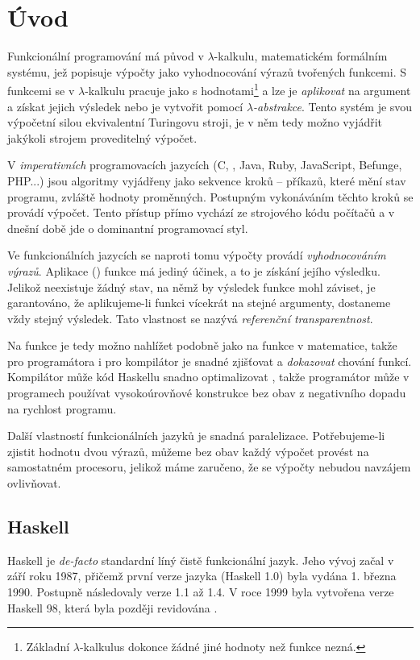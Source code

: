 \chapter{Úvod}

Funkcionální programování má původ v $\lambda$-kalkulu, matematickém formálním
systému, jež popisuje výpočty jako vyhodnocování výrazů tvořených funkcemi.  S
funkcemi se v $\lambda$-kalkulu pracuje jako s hodnotami\footnote{Základní
$\lambda$-kalkulus dokonce žádné jiné hodnoty než funkce nezná.} a lze je
\emph{aplikovat} na argument a získat jejich výsledek nebo je vytvořit pomocí
\emph{$\lambda$-abstrakce}. Tento systém je svou výpočetní silou ekvivalentní
Turingovu stroji, je v něm tedy možno vyjádřit jakýkoli strojem proveditelný
výpočet.

V \emph{imperativních} programovacích jazycích (C, \Cplusplus{}, Java, Ruby,
JavaScript, Befunge, PHP...) jsou algoritmy vyjádřeny jako sekvence kroků --
příkazů, které mění stav programu, zvláště hodnoty proměnných. Postupným
vykonáváním těchto kroků se provádí výpočet. Tento přístup přímo vychází ze
strojového kódu počítačů a v dnešní době jde o dominantní programovací styl.

Ve funkcionálních jazycích se naproti tomu výpočty provádí \emph{vyhodnocováním
výrazů}. Aplikace () funkce má jediný účinek, a to je získání
jejího výsledku. Jelikož neexistuje žádný stav, na němž by výsledek funkce mohl
záviset, je garantováno, že aplikujeme-li funkci vícekrát na stejné argumenty,
dostaneme vždy stejný výsledek. Tato vlastnost se nazývá \emph{referenční
transparentnost}.

Na funkce je tedy možno nahlížet podobně jako na funkce v matematice, takže pro
programátora i pro kompilátor je snadné zjišťovat a \emph{dokazovat} chování
funkcí. Kompilátor může kód Haskellu snadno optimalizovat
\cite{santos1995compilation}, takže programátor může v programech používat
vysokoúrovňové konstrukce bez obav z negativního dopadu na rychlost programu.

Další vlastností funkcionálních jazyků je snadná paralelizace. Potřebujeme-li
zjistit hodnotu dvou výrazů, můžeme bez obav každý výpočet provést na
samostatném procesoru, jelikož máme zaručeno, že se výpočty nebudou navzájem
ovlivňovat.

\section{Haskell}

Haskell je \textit{de-facto} standardní líný čistě funkcionální jazyk. Jeho
vývoj začal v září roku 1987, přičemž první verze jazyka (Haskell 1.0) byla
vydána 1. března 1990. Postupně následovaly verze 1.1 až 1.4. V roce 1999 byla
vytvořena  verze Haskell 98, která byla později revidována
\cite{jones2003haskell}. \cite{hudak2007history}

